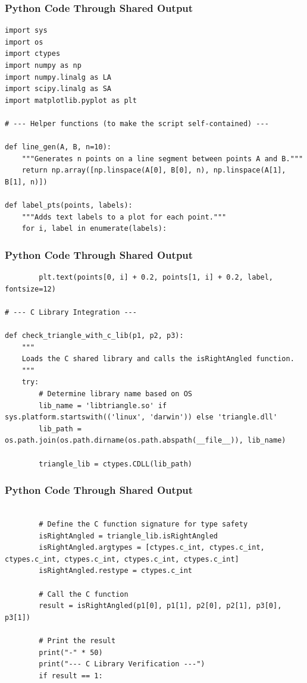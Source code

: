 \documentclass{beamer}
\begin{document}
\begin{frame}[fragile]
\frametitle{Python Code Through Shared Output}
\begin{lstlisting}
import sys
import os
import ctypes
import numpy as np
import numpy.linalg as LA
import scipy.linalg as SA
import matplotlib.pyplot as plt

# --- Helper functions (to make the script self-contained) ---

def line_gen(A, B, n=10):
    """Generates n points on a line segment between points A and B."""
    return np.array([np.linspace(A[0], B[0], n), np.linspace(A[1], B[1], n)])

def label_pts(points, labels):
    """Adds text labels to a plot for each point."""
    for i, label in enumerate(labels):
    \end{lstlisting}
\end{frame}  

\begin{frame}[fragile]
\frametitle{Python Code Through Shared Output}
\begin{lstlisting}
        plt.text(points[0, i] + 0.2, points[1, i] + 0.2, label, fontsize=12)

# --- C Library Integration ---

def check_triangle_with_c_lib(p1, p2, p3):
    """
    Loads the C shared library and calls the isRightAngled function.
    """
    try:
        # Determine library name based on OS
        lib_name = 'libtriangle.so' if sys.platform.startswith(('linux', 'darwin')) else 'triangle.dll'
        lib_path = os.path.join(os.path.dirname(os.path.abspath(__file__)), lib_name)
        
        triangle_lib = ctypes.CDLL(lib_path)
        \end{lstlisting}
\end{frame}  

\begin{frame}[fragile]
\frametitle{Python Code Through Shared Output}
\begin{lstlisting}

        # Define the C function signature for type safety
        isRightAngled = triangle_lib.isRightAngled
        isRightAngled.argtypes = [ctypes.c_int, ctypes.c_int, ctypes.c_int, ctypes.c_int, ctypes.c_int, ctypes.c_int]
        isRightAngled.restype = ctypes.c_int

        # Call the C function
        result = isRightAngled(p1[0], p1[1], p2[0], p2[1], p3[0], p3[1])

        # Print the result
        print("-" * 50)
        print("--- C Library Verification ---")
        if result == 1:
        \end{lstlisting}
\end{frame}  
\end{document}
